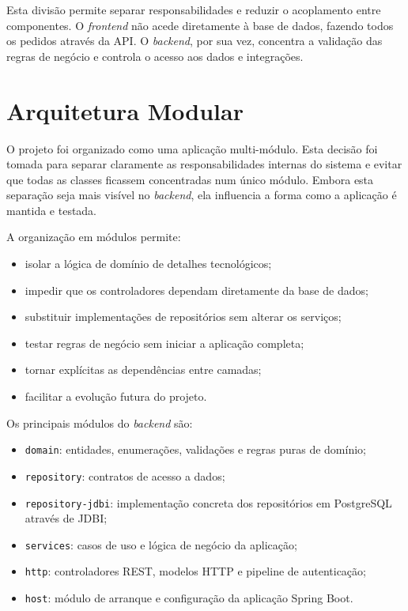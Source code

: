 Esta divisão permite separar responsabilidades e reduzir o acoplamento entre
componentes. O \textit{frontend} não acede diretamente à base de dados, fazendo
todos os pedidos através da API. O \textit{backend}, por sua vez, concentra a
validação das regras de negócio e controla o acesso aos dados e integrações.

\section{Arquitetura Modular}

O projeto foi organizado como uma aplicação multi-módulo. Esta decisão foi
tomada para separar claramente as responsabilidades internas do sistema e
evitar que todas as classes ficassem concentradas num único módulo. Embora esta
separação seja mais visível no \textit{backend}, ela influencia a forma como a
aplicação é mantida e testada.

A organização em módulos permite:

\begin{itemize}
    \item isolar a lógica de domínio de detalhes tecnológicos;
    \item impedir que os controladores dependam diretamente da base de dados;
    \item substituir implementações de repositórios sem alterar os serviços;
    \item testar regras de negócio sem iniciar a aplicação completa;
    \item tornar explícitas as dependências entre camadas;
    \item facilitar a evolução futura do projeto.
\end{itemize}

Os principais módulos do \textit{backend} são:

\begin{itemize}
    \item \texttt{domain}: entidades, enumerações, validações e regras puras de
    domínio;
    \item \texttt{repository}: contratos de acesso a dados;
    \item \texttt{repository-jdbi}: implementação concreta dos repositórios em
    PostgreSQL através de JDBI;
    \item \texttt{services}: casos de uso e lógica de negócio da aplicação;
    \item \texttt{http}: controladores REST, modelos HTTP e pipeline de
    autenticação;
    \item \texttt{host}: módulo de arranque e configuração da aplicação Spring
    Boot.
\end{itemize}

